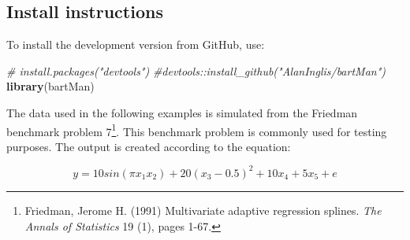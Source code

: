 \documentclass[
]{article}
\newenvironment{Shaded}{\begin{snugshade}}{\end{snugshade}}
\newcommand{\CommentTok}[1]{\textcolor[rgb]{0.56,0.35,0.01}{\textit{#1}}}
\newcommand{\FunctionTok}[1]{\textcolor[rgb]{0.13,0.29,0.53}{\textbf{#1}}}
\newcommand{\NormalTok}[1]{#1}
\begin{document}
\hypertarget{install-instructions}{%
\subsection{Install instructions}\label{install-instructions}}

To install the development version from GitHub, use:

\begin{Shaded}
\begin{Highlighting}[]
\CommentTok{\# install.packages("devtools")}
\CommentTok{\#devtools::install\_github("AlanInglis/bartMan")}
\FunctionTok{library}\NormalTok{(bartMan)}
\end{Highlighting}
\end{Shaded}

The data used in the following examples is simulated from the Friedman
benchmark problem 7\footnote{Friedman, Jerome H. (1991) Multivariate
  adaptive regression splines. \emph{The Annals of Statistics} 19 (1),
  pages 1-67.}. This benchmark problem is commonly used for testing
purposes. The output is created according to the equation:

\[y = 10 sin(π x_1 x_2) + 20 (x_3 - 0.5)^2 + 10 x_4 + 5 x_5 + e\]
\end{document}
